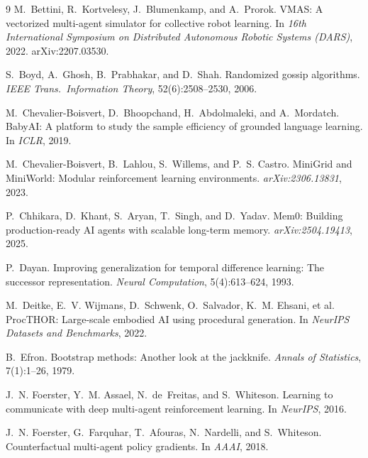 \documentclass{article}
\begin{document}
{\begin{thebibliography}{9}
M.~Bettini, R.~Kortvelesy, J.~Blumenkamp, and A.~Prorok.
\newblock VMAS: A vectorized multi-agent simulator for collective robot learning.
\newblock In \emph{16th International Symposium on Distributed Autonomous Robotic Systems (DARS)}, 2022.
\newblock arXiv:2207.03530.

S.~Boyd, A.~Ghosh, B.~Prabhakar, and D.~Shah.
\newblock Randomized gossip algorithms.
\newblock \emph{IEEE Trans.\ Information Theory}, 52(6):2508--2530, 2006.

M.~Chevalier-Boisvert, D.~Bhoopchand, H.~Abdolmaleki, and A.~Mordatch.
\newblock BabyAI: A platform to study the sample efficiency of grounded language learning.
\newblock In \emph{ICLR}, 2019.

M.~Chevalier-Boisvert, B.~Lahlou, S.~Willems, and P.~S. Castro.
\newblock MiniGrid and MiniWorld: Modular reinforcement learning environments.
\newblock \emph{arXiv:2306.13831}, 2023.

P.~Chhikara, D.~Khant, S.~Aryan, T.~Singh, and D.~Yadav.
\newblock Mem0: Building production-ready AI agents with scalable long-term memory.
\newblock \emph{arXiv:2504.19413}, 2025.

P.~Dayan.
\newblock Improving generalization for temporal difference learning: The successor representation.
\newblock \emph{Neural Computation}, 5(4):613--624, 1993.

M.~Deitke, E.~V. Wijmans, D.~Schwenk, O.~Salvador, K.~M. Ehsani, et al.
\newblock ProcTHOR: Large-scale embodied AI using procedural generation.
\newblock In \emph{NeurIPS Datasets and Benchmarks}, 2022.

B.~Efron.
\newblock Bootstrap methods: Another look at the jackknife.
\newblock \emph{Annals of Statistics}, 7(1):1--26, 1979.

J.~N. Foerster, Y.~M. Assael, N.~de~Freitas, and S.~Whiteson.
\newblock Learning to communicate with deep multi-agent reinforcement learning.
\newblock In \emph{NeurIPS}, 2016.

J.~N. Foerster, G.~Farquhar, T.~Afouras, N.~Nardelli, and S.~Whiteson.
\newblock Counterfactual multi-agent policy gradients.
\newblock In \emph{AAAI}, 2018.


\end{thebibliography}}
\end{document}
